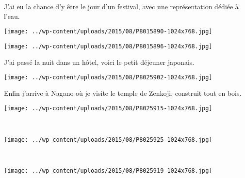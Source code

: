 J'ai eu la chance d'y être le jour d'un festival, avec une représentation dédiée à l'eau.  
\begin{center} \texttt{[image: ../wp-content/uploads/2015/08/P8015890-1024x768.jpg]} \end{center}
\begin{center} \texttt{[image: ../wp-content/uploads/2015/08/P8015896-1024x768.jpg]} \end{center}
\vspace{-\topsep}
\vspace{-2.75mm}
\pagebreak

 J'ai passé la nuit dans un hôtel, voici le petit déjeuner japonais.
\begin{center} \texttt{[image: ../wp-content/uploads/2015/08/P8025902-1024x768.jpg]} \end{center}

 Enfin j'arrive à Nagano où je visite le temple de Zenkoji, construit tout en bois. 
\begin{center} \texttt{[image: ../wp-content/uploads/2015/08/P8025915-1024x768.jpg]} \end{center}
\vspace{-\topsep}
\pagebreak
~
\vspace{1mm}
\vfill
\begin{center} \texttt{[image: ../wp-content/uploads/2015/08/P8025925-1024x768.jpg]} \end{center}
\vfill
~\\
\vfill
\begin{center} \texttt{[image: ../wp-content/uploads/2015/08/P8025919-1024x768.jpg]} \end{center}
\vspace{-\topsep}
\vspace{-0.75mm}